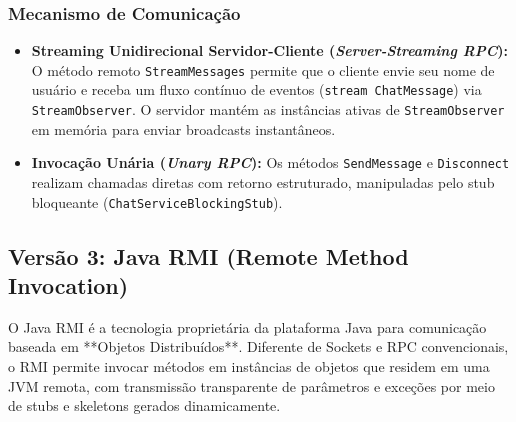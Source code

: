 \documentclass[12pt,a4paper]{article}
\begin{document}
\subsubsection{Mecanismo de Comunicação}
\begin{itemize}
    \item \textbf{Streaming Unidirecional Servidor-Cliente (\textit{Server-Streaming RPC}):} O método remoto \texttt{StreamMessages} permite que o cliente envie seu nome de usuário e receba um fluxo contínuo de eventos (\texttt{stream ChatMessage}) via \texttt{StreamObserver}. O servidor mantém as instâncias ativas de \texttt{StreamObserver} em memória para enviar broadcasts instantâneos.
    \item \textbf{Invocação Unária (\textit{Unary RPC}):} Os métodos \texttt{SendMessage} e \texttt{Disconnect} realizam chamadas diretas com retorno estruturado, manipuladas pelo stub bloqueante (\texttt{ChatServiceBlockingStub}).
\end{itemize}

\subsection{Versão 3: Java RMI (Remote Method Invocation)}
O Java RMI é a tecnologia proprietária da plataforma Java para comunicação baseada em **Objetos Distribuídos**. Diferente de Sockets e RPC convencionais, o RMI permite invocar métodos em instâncias de objetos que residem em uma JVM remota, com transmissão transparente de parâmetros e exceções por meio de stubs e skeletons gerados dinamicamente.
\end{document}
